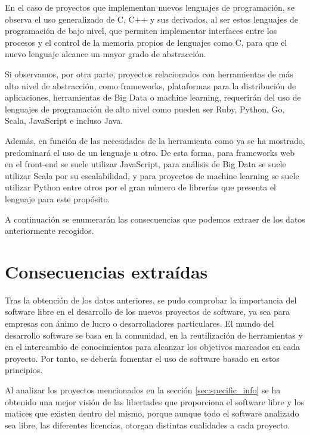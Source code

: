 \documentclass[a4paper, spanish, 12pt]{book}
\begin{document}
En el caso de proyectos que implementan nuevos lenguajes de programaci\'on, se observa
el uso generalizado de C, C++ y sus derivados, al ser estos lenguajes de programaci\'on
de bajo nivel, que permiten implementar interfaces entre los procesos y el control de
la memoria propios de lenguajes como C, para que el nuevo lenguaje alcance un mayor grado de abstracci\'on.

Si observamos, por otra parte, proyectos relacionados con herramientas de m\'as alto
nivel de abstracci\'on, como frameworks, plataformas para la distribuci\'on de aplicaciones, herramientas
de Big Data o machine learning, requerir\'an del uso de lenguajes de programaci\'on de alto
nivel como pueden ser Ruby, Python, Go, Scala, JavaScript e incluso Java.

Adem\'as, en funci\'on de las necesidades de la herramienta como ya se ha mostrado,
predominar\'a el uso de un lenguaje u otro. De esta forma, para frameworks web en el
front-end se suele utilizar JavaScript, para an\'alisis de Big Data se suele
utilizar Scala por su escalabilidad, y para proyectos de machine learning se suele
utilizar Python entre otros por el gran n\'umero de librer\'ias que presenta el
lenguaje para este prop\'osito.

A continuaci\'on se enumerar\'an las consecuencias que podemos extraer de los datos
anteriormente recogidos.

\section{Consecuencias extra\'idas}
\label{sec:consecuencias}

Tras la obtenci\'on de los datos anteriores, se pudo comprobar la importancia del software libre en el desarrollo de los nuevos
proyectos de software, ya sea para empresas con \'animo de lucro o desarrolladores particulares. El mundo del desarrollo software
se basa en la comunidad, en la reutilizaci\'on de herramientas y en el intercambio de conocimientos para alcanzar los
objetivos marcados en cada proyecto. Por tanto, se deber\'ia fomentar el uso de software basado en estos principios.

Al analizar los proyectos mencionados en la secci\'on \ref{sec:specific_info} se ha obtenido una mejor visi\'on de las libertades que proporciona
el software libre y los matices que existen dentro del mismo, porque aunque todo el software analizado sea
libre, las diferentes licencias, otorgan distintas cualidades a cada proyecto.
\end{document}
